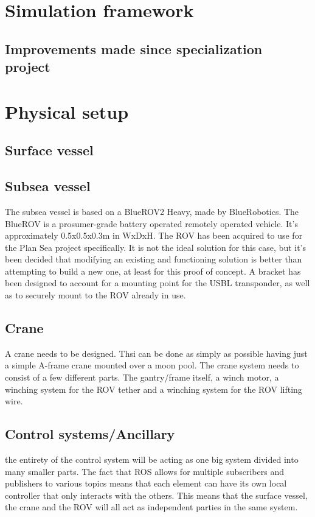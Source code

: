 \documentclass[class=article, crop=false]{standalone}
\begin{document}
\section{Simulation framework}
\subsection{Improvements made since specialization project}

\section{Physical setup}
\subsection{Surface vessel}
\subsection{Subsea vessel}
The subsea vessel is based on a BlueROV2 Heavy, made by BlueRobotics. The BlueROV is a prosumer-grade battery operated remotely operated vehicle. It's approximately 0.5x0.5x0.3m in WxDxH. The ROV has been acquired to use for the Plan Sea project specifically. It is not the ideal solution for this case, but it's been decided that modifying an existing and functioning solution is better than attempting to build a new one, at least for this proof of concept.
A bracket has been designed to account for a mounting point for the USBL transponder, as well as to securely mount to the ROV already in use.
\subsection{Crane}
A crane needs to be designed. Thsi can be done as simply as possible having just a simple A-frame crane mounted over a moon pool. The crane system needs to consist of a few different parts. The gantry/frame itself, a winch motor, a winching system for the ROV tether and a winching system for the ROV lifting wire.
\subsection{Control systems/Ancillary}
the entirety of the control system will be acting as one big system divided into many smaller parts. The fact that ROS allows for multiple subscribers and publishers to various topics means that each element can have its own local controller that only interacts with the others. This means that the surface vessel, the crane and the ROV will all act as independent parties in the same system.
\end{document}
